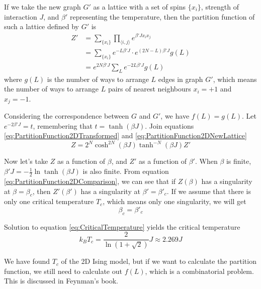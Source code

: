 \documentclass[11pt]{article}
\begin{document}
	If we take the new graph $G'$ as a lattice with a set of spins $\{x_i\}$, strength of interaction $J$, and $\beta'$ representing the temperature, then the partition function of such a lattice defined by $G'$ is
	\begin{equation} \label{eq:PartitionFunction2DNewLattice}
		\begin{aligned}
			Z' &= \sum_{\{x_i\}} \prod_{\langle i,j \rangle} e^{\beta' J x_i x_j} \\
			&= \sum_{\{x_i\}} e^{-L\beta' J} \cdot e^{(2N-L)\beta' J} g(L) \\
			&= e^{2N\beta' J} \sum_{L} e^{-2L\beta' J} g(L)
		\end{aligned}
	\end{equation}
	where $g(L)$ is the number of ways to arrange $L$ edges in graph $G'$, which means the number of ways to arrange $L$ pairs of nearest neighbours $x_i=+1$ and $x_j=-1$.
	
	Considering the correspondence between $G$ and $G'$, we have $f(L) = g(L)$. Let $e^{-2\beta' J} = t$, remembering that $t = \tanh(\beta J)$. Join equations \eqref{eq:PartitionFunction2DTransformed} and \eqref{eq:PartitionFunction2DNewLattice}
	\begin{equation} \label{eq:PartitionFunction2DComparison}
		Z = 2^N \cosh^{2N}(\beta J) \tanh^{-N}(\beta J) Z'
	\end{equation}

	Now let's take $Z$ as a function of $\beta$, and $Z'$ as a function of $\beta'$. When $\beta$ is finite, $\beta' J = -\frac12 \ln{\tanh(\beta J)}$ is also finite. From equation \eqref{eq:PartitionFunction2DComparison}, we can see that if $Z(\beta)$ has a singularity at $\beta = \beta_c$, then $Z'(\beta')$ has a singularity at $\beta' = \beta'_c$.
	If we assume that there is only one critical temperature $T_c$, which means only one singularity, we will get
	\begin{equation} \label{eq:Singularity}
		\beta_c = \beta'_c
	\end{equation}

	Solution to equation \eqref{eq:CriticalTemperature} yields the critical temperature
	\begin{equation} \label{eq:CriticalTemperature}
		k_B T_c = \frac{2}{\ln(1+\sqrt{2})}J \approx 2.269J
	\end{equation}

	We have found $T_c$ of the 2D Ising model, but if we want to calculate the partition function, we still need to calculate out $f(L)$, which is a combinatorial problem. This is discussed in Feynman's book\cite{feynman1972statistical}.
	
\end{document}

